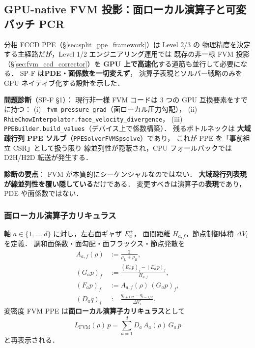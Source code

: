 %
%
\subsection{GPU-native FVM 投影：面ローカル演算子と可変バッチ PCR}
\label{sec:gpu_native_fvm_projection}

分相 FCCD PPE（\S\ref{sec:split_ppe_framework}）は Level 2/3 の
物理精度を決定する主経路だが，Level 1/2 エンジニアリング運用では
既存の非一様 FVM 投影（\S\ref{sec:fvm_ccd_corrector}）を
\textbf{GPU 上で高速化}する道筋も並行して必要になる．
SP-F \cite{SPF} は\textbf{PDE・面係数を一切変えず}，
演算子表現とソルバー戦略のみを GPU ネイティブ化する設計を示した．

\noindent\textbf{問題診断}（SP-F \cite{SPF} §1）：
現行非一様 FVM コードは 3 つの GPU 互換要素をすでに持つ：
(i) \texttt{\_fvm\_pressure\_grad}（面ローカル圧力勾配），
(ii) \texttt{RhieChowInterpolator.face\_velocity\_divergence}，
(iii) \texttt{PPEBuilder.build\_values}（デバイス上で係数構築）．
残るボトルネックは
\textbf{大域疎行列 PPE ソルブ}（\texttt{PPESolverFVMSpsolve}）であり，
これが PPE を「事前組立 CSR」として扱う限り
線並列性が隠蔽され，CPU フォールバックでは D2H/H2D 転送が発生する．

\noindent\textbf{診断の要点}：
FVM が本質的にシーケンシャルなのではない．
\textbf{大域疎行列表現が線並列性を覆い隠している}だけである．
変更すべきは演算子の\textbf{表現}であり，PDE や面係数ではない．

\subsubsection{面ローカル演算子カリキュラス}
\label{sec:gpu_fvm_face_local_calculus}

軸 $a\in\{1,\ldots,d\}$ に対し，左右面ギャザ $E_a^\pm$，
面間距離 $H_{a,f}$，節点制御体積 $\Delta V_i$ を定義．
調和面係数・面勾配・面フラックス・節点発散を
\begin{align}
  A_{a,f}(\rho) &:= \frac{2}{\rho_L+\rho_R},
    \label{eq:fvm_face_harmonic}\\
  (G_a p)_f &:= \frac{(E_a^+ p)_f - (E_a^- p)_f}{H_{a,f}},
    \label{eq:fvm_face_gradient}\\
  (F_a p)_f &:= A_{a,f}(\rho)\,(G_a p)_f,
    \label{eq:fvm_face_flux}\\
  (D_a q)_i &:= \frac{q_{i+1/2}-q_{i-1/2}}{\Delta V_i}.
    \label{eq:fvm_node_divergence}
\end{align}
変密度 FVM PPE は\textbf{面ローカル演算子カリキュラス}として
\begin{equation}
  \boxed{\
    L_\text{FVM}(\rho)\,p = \sum_{a=1}^{d} D_a\,A_a(\rho)\,G_a\,p
  \ }
  \label{eq:fvm_operator_calculus}
\end{equation}
と再表示される．

